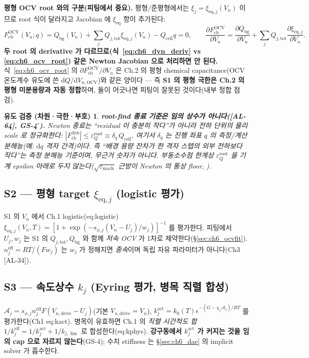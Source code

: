 \documentclass[11pt,a4paper]{article}
\newtheorem*{verifybox}{유도 검증 (차원·극한·부호)}
\newcommand{\dd}{\mathrm{d}}
\newcommand{\eff}{\mathrm{eff}}
\newcommand{\eq}{\mathrm{eq}}
\newcommand{\drive}{\mathrm{drive}}
\newcommand{\bg}{\mathrm{bg}}
\newcommand{\cell}{\mathrm{cell}}
\newcommand{\OCV}{\mathrm{OCV}}
\newcommand{\tot}{\mathrm{tot}}
\newcommand{\cb}{\mathrm{cb}}
\newcommand{\dyn}{\mathrm{dyn}}
\newcommand{\AL}[1]{\textsf{[AL-#1]}}
\begin{document}
\textbf{평형 OCV root 와의 구분(피팅에서 중요).} 평형/준평형에서는 $\xi_j=\xi_{\eq,j}(V_n)$ 이므로 root 식이
달라지고 Jacobian 에 $\xi_{\eq}$ 항이 추가된다:
\begin{equation}
F_\cb^\OCV(V_n;q)=Q_\bg(V_n)+\sum_j Q_{j,\tot}\xi_{\eq,j}(V_n)-Q_\cell q=0,\qquad
\frac{\partial F_\cb^\OCV}{\partial V_n}=\frac{\partial Q_\bg}{\partial V_n}+\sum_j Q_{j,\tot}\frac{\partial\xi_{\eq,j}}{\partial V_n}.
\label{eq:ch6_ocv_root}
\end{equation}
\textbf{두 root 의 derivative 가 다르므로(식~\eqref{eq:ch6_dyn_deriv} vs \eqref{eq:ch6_ocv_root}) 같은 Newton
Jacobian 으로 처리하면 안 된다.} 식~\eqref{eq:ch6_ocv_root} 의 $\partial F_\cb^\OCV/\partial V_n$ 은 Ch.2 의
평형 chemical capacitance(OCV 온도계수 유도에 쓴 $\dd Q/\dd V_{n,\OCV}$)와 같은 양이다 — 즉 \textbf{S1 의
평형 극한은 Ch.2 의 평형 미분용량과 자동 정합}하며, 둘이 어긋나면 피팅이 잘못된 것이다(내부 정합 점검).
\begin{verifybox}
\textbf{root-find 종료 기준은 임의 상수가 아니다(\AL{64}, GS-4$'$).} Newton 종료는 ``residual 이 충분히 작다''가
아니라 \emph{전하 단위의 물리 scale} 로 정규화한다: $|F_\cb^\dyn|\le\varepsilon_Q^{\mathrm{root}}\equiv
\delta_q\,Q_\cell$, 여기서 $\delta_q$ 는 진행 좌표 $q$ 의 측정/계산 분해능(예: $\dd q$ 격자 간격)이다. 즉 ``배경
용량 잔차가 한 격자 스텝의 외부 전하보다 작다''는 \emph{측정 분해능 기준}이며, 무근거 숫자가 아니다. 부동소수점
한계상 $\varepsilon_Q^{\mathrm{root}}$ 을 기계 epsilon 아래로 두지 않는다($\sqrt{\varepsilon_{\mathrm{mach}}}$
근방이 Newton 의 통상 floor, \cite{brenan1996}).
\end{verifybox}

\subsection{S2 — 평형 target $\xi_{\eq,j}$ (logistic 평가)}\label{sec:ch6_S2}
S1 의 $V_n$ 에서 Ch.1 logistic(eq:logistic) $\xi_{\eq,j}(V_n,T)=[1+\exp(-s_{\phi,j}(V_n-U_j)/w_j)]^{-1}$ 를 평가한다.
피팅에서 $U_j,w_j$ 는 S1 의 $Q_{j,\tot},Q_\bg$ 와 함께 \emph{저속 OCV} 가 1차로 제약한다(\S\ref{sec:ch6_ocvfit}).
$n_j^{\eff}=RT/(Fw_j)$ 는 $w_j$ 가 정해지면 \emph{종속}이며 독립 자유 파라미터가 아니다(Ch3 \AL{34}).

\subsection{S3 — 속도상수 $k_j$ (Eyring 평가, 병목 직렬 합성)}\label{sec:ch6_S3}
$\mathcal A_j=s_{\phi,j}n_j^{\eff}F(V_{n,\drive}-U_j)$(기본 $V_{n,\drive}=V_n$), $k_j^{\mathrm{act}}=k_0(T)
e^{-(G-\chi_j\mathcal A_j)/RT}$ 를 평가한다(Ch1 eq:kact). 병목이 유효하면 Ch.1 의 \emph{직렬 시간척도 합}
$1/k_j^{\eff}=1/k_j^{\mathrm{act}}+1/k_{j,\lim}$ 로 합성한다(eq:kphys). \textbf{강구동에서 $k_j^{\mathrm{act}}$ 가
커지는 것을 임의 cap 으로 자르지 않는다}(GS-4); 수치 stiffness 는 \S\ref{sec:ch6_dae} 의 implicit solver 가
흡수한다.
\end{document}
